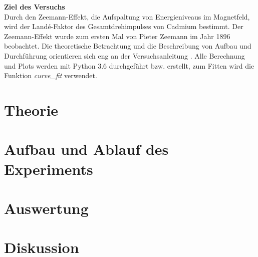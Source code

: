 \documentclass[a4,11pt]{article}
\newcommand{\V}{V27}
\begin{document}



\tableofcontents
\clearpage



\textbf{Ziel des Versuchs} \\
Durch den Zeemann-Effekt, die Aufspaltung von Energieniveaus im Magnetfeld, wird der Landé-Faktor des Gesamtdrehimpulses von Cadmium bestimmt. Der Zeemann-Effekt wurde zum ersten Mal von Pieter Zeemann im Jahr 1896 beobachtet.
Die theoretische Betrachtung und die Beschreibung von Aufbau und Durchführung orientieren sich eng an der Versuchsanleitung \cite{\V}. Alle Berechnung und Plots werden mit Python 3.6 durchgeführt bzw. erstellt, zum Fitten wird die Funktion \textit{curve\_fit} verwendet.

\section{Theorie}

\clearpage


\section{Aufbau und Ablauf des Experiments}

\clearpage


\section{Auswertung}

\clearpage


\section{Diskussion}


\clearpage
\listoftodos
\listoffigures
\listoftables
\clearpage
\nocite{\V}
\printbibliography[title = Literaturverzeichnis]
\end{document}
